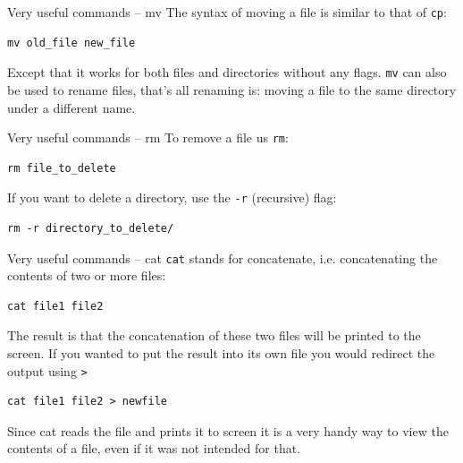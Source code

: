 \documentclass[10pt]{beamer}
\begin{document}
\begin{frame}[label={sec:orgb6897e0},fragile]{Very useful commands -- mv}
 The syntax of moving a file is similar to that of \texttt{cp}:

\begin{verbatim}
mv old_file new_file
\end{verbatim}

Except that it works for both files and directories without any flags. \texttt{mv} can
also be used to \alert{rename} files, that's all renaming is: moving a file to the same
directory under a different name.
\end{frame}

\begin{frame}[label={sec:org100f2e2},fragile]{Very useful commands -- rm}
 To remove a file us \texttt{rm}:

\begin{verbatim}
rm file_to_delete
\end{verbatim}

If you want to delete a directory, use the \texttt{-r} (recursive) flag:

\begin{verbatim}
rm -r directory_to_delete/
\end{verbatim}
\end{frame}

\begin{frame}[label={sec:org6aa6c0f},fragile]{Very useful commands -- cat}
 \texttt{cat} stands for concatenate, i.e. concatenating the contents of two or more
files:

\begin{verbatim}
cat file1 file2
\end{verbatim}

The result is that the concatenation of these two files will be printed to the
screen. If you wanted to put the result into its own file you would redirect the
output using \texttt{>}

\begin{verbatim}
cat file1 file2 > newfile
\end{verbatim}

Since cat reads the file and prints it to screen it is a very handy way to view
the contents of a file, even if it was not intended for that.
\end{frame}
\end{document}
